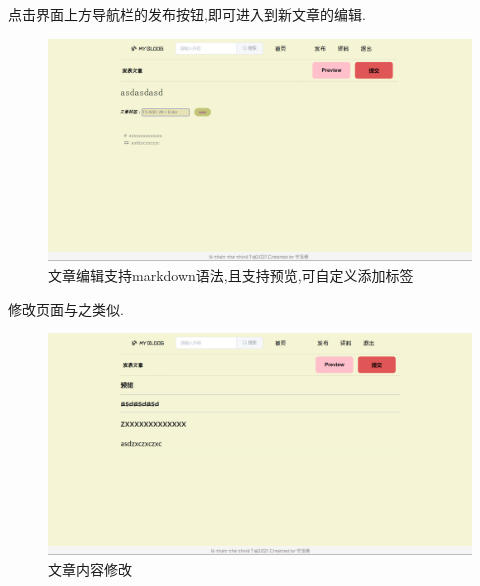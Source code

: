 点击界面上方导航栏的发布按钮,即可进入到新文章的编辑.
\begin{figure}[thbp!]
	\centering
	\includegraphics[scale=0.35]{figure/new}
	\caption{文章编辑支持markdown语法,且支持预览,可自定义添加标签}
\end{figure}

修改页面与之类似.
\begin{figure}[thbp!]
	\centering
	\includegraphics[scale=0.35]{figure/modify}
	\caption{文章内容修改}
\end{figure}


